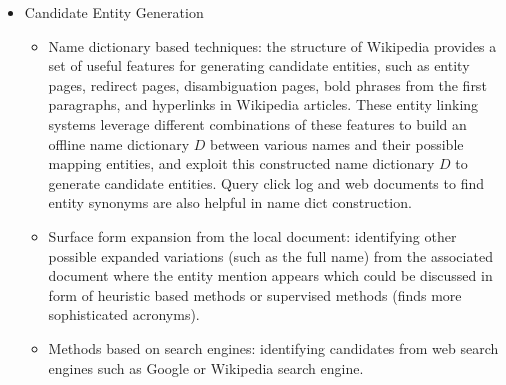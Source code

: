 \documentclass[letterpaper,12pt]{article}
\begin{document}
\begin{itemize}
    \item Candidate Entity Generation
\begin{itemize}
    \item Name dictionary based techniques: the structure of Wikipedia provides a
set of useful features for generating candidate entities,
such as entity pages, redirect pages, disambiguation
pages, bold phrases from the first paragraphs, and
hyperlinks in Wikipedia articles. These entity linking
systems leverage different combinations of these
features to build an offline name dictionary $D$
between various names and their possible mapping
entities, and exploit this constructed name dictionary
$D$ to generate candidate entities. Query click log and web documents to find entity synonyms are also helpful in name dict construction.
    \item Surface form expansion from the local document: identifying other possible expanded variations (such as
the full name) from the associated document where
the entity mention appears which could be discussed in form of heuristic based methods or supervised methods (finds more sophisticated acronyms).
    \item Methods based on search engines: identifying candidates from web search engines such as Google or Wikipedia search engine.
\end{itemize}


\end{itemize}
\end{document}
